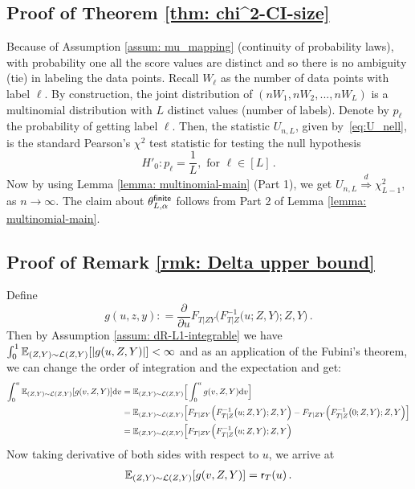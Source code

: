 \documentclass[11pt]{article}
\begin{document}
\subsection{Proof of Theorem \ref{thm: chi^2-CI-size}}\label{proof:thm: chi^2-CI-size}
Because of Assumption \ref{assum: mu_mapping} (continuity of probability laws),  with probability one all the score values are distinct and so there is no ambiguity (tie) in labeling the data points.
Recall $W_\ell$ as the number of data points with label $\ell$.
By construction, the joint distribution of $(nW_1,nW_2,...,nW_{L})$ is a multinomial distribution with $L$ distinct values (number of labels). Denote by $p_\ell$ the probability of getting label $\ell$. 
%
Then, the statistic $U_{n,L}$, given by~\eqref{eq:U_nell}, is the standard Pearson's $\chi^2$ test statistic for testing the null hypothesis 
\begin{equation}\label{eq: tmp11}
H'_0: p_{\ell}=\frac{1}{L}, \text{ for } \ell\in[L]\,.
\end{equation}
Now by using Lemma \ref{lemma: multinomial-main} (Part 1), we get $U_{n,L} \overset{d}{\Rightarrow} \chi^{2}_{L-1}$, as $n\to\infty$.  The claim about $\theta_{L,\alpha}^{\mathsf{finite}}$ follows from Part 2 of Lemma \ref{lemma: multinomial-main}.






\subsection{Proof of Remark \ref{rmk: Delta upper bound} }\label{proof:rmk: Delta upper bound}
Define 
\[
g(u,z,y) : = \frac{\partial}{\partial u}F_{T|ZY}\Big( F_{T|Z}^{-1}\big(u; Z,Y\big) ; Z,Y\Big)  \,.
\]
Then by Assumption \ref{assum: dR-L1-integrable} we have $\int_0^1 {\mathbb E}_{(Z,Y) \sim \mathcal{L}(Z,Y)}[|g(u,Z,Y)|]<\infty$ and as an application of the Fubini's theorem, we can change the order of integration and the expectation and get:
\begin{align*}
\int_0^u {\mathbb E}_{(Z,Y) \sim \mathcal{L}(Z,Y)}[g(v,Z,Y)]{\rm d} v &= 
 {\mathbb E}_{(Z,Y) \sim \mathcal{L}(Z,Y)}\Big[\int_0^u g(v,Z,Y) {\rm d} v\Big]\\
 &= {\mathbb E}_{(Z,Y) \sim \mathcal{L}(Z,Y)}\Big[F_{T|ZY}\Big( F_{T|Z}^{-1}\big(u; Z,Y\big) ; Z,Y\Big) - F_{T|ZY}\Big( F_{T|Z}^{-1}\big(0; Z,Y\big) ; Z,Y\Big)\Big]\\
 &=  {\mathbb E}_{(Z,Y) \sim \mathcal{L}(Z,Y)}\Big[F_{T|ZY}\Big( F_{T|Z}^{-1}\big(u; Z,Y\big) ; Z,Y\Big)
\end{align*}
Now taking derivative of both sides with respect to $u$, we arrive at
\begin{align}\label{eq:interchange}
{\mathbb E}_{(Z,Y) \sim \mathcal{L}(Z,Y)}[g(v,Z,Y)] =  \mathsf{r}_T(u)\,.
\end{align}
	
\end{document}
